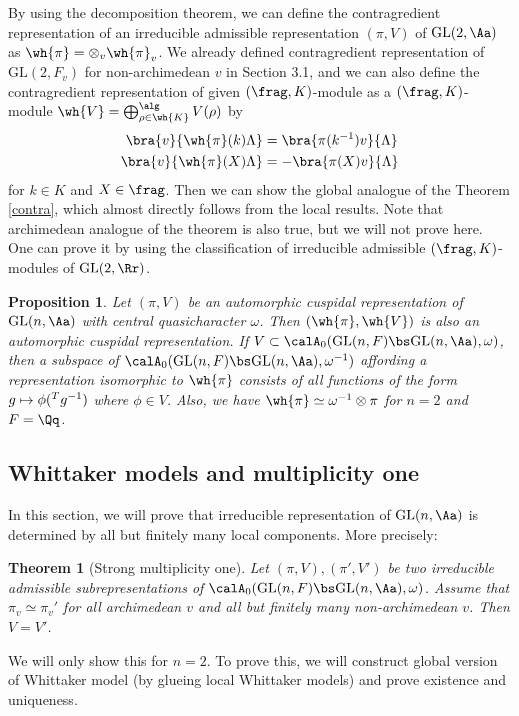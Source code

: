 \documentclass{article}
\newtheorem{theorem}{Theorem}[section]
\newcommand{\pre}[1]{\prescript{#1}{}}
\newcommand{\GL}{\mathrm{GL}}
\newtheorem{proposition}{Proposition}[section]
\begin{document}
By using the decomposition theorem, we can define the contragredient representation of an irreducible admissible representation $(\pi, V)$ of $\GL(2, \Aa)$ as $\wh{\pi} = \otimes_{v} \wh{\pi}_v$. 
We already defined contragredient representation of $\GL(2, F_{v})$ for non-archimedean $v$ in Section 3.1, and we can also define the contragredient representation of given $(\frag, K)$-module as a $(\frag, K)$-module $\wh{V} = \bigoplus_{\rho\in \wh{K}}^{\alg}V(\rho)$ by 
\begin{align*}
\bra{v}{\wh{\pi}(k)\Lambda} &= \bra{\pi(k^{-1})v}{\Lambda} \\
\bra{v}{\wh{\pi}(X)\Lambda} &= -\bra{\pi(X)v}{\Lambda} 
\end{align*}
for $k\in K$ and $X\in \frag$. 
Then we can show the global analogue of the Theorem \ref{contra}, which almost directly follows from the local results. 
Note that archimedean analogue of the theorem is also true, but we will not prove here. One can prove it by using the classification of irreducible admissible $(\frag, K)$-modules of $\GL(2, \Rr)$. 
\begin{proposition}
Let $(\pi, V)$ be an automorphic cuspidal representation of $\GL(n, \Aa)$ with central quasicharacter $\omega$. 
Then $(\wh{\pi}, \wh{V})$ is also an automorphic cuspidal representation. 
If $V\subset \calA_{0}(\GL(n, F)\bs\GL(n, \Aa), \omega)$, then a subspace of $\calA_{0}(\GL(n, F)\bs\GL(n, \Aa), \omega^{-1})$ affording a representation isomorphic to $\wh{\pi}$ consists of all functions of the form $g\mapsto \phi(\pre{T}{g}^{-1})$ where $\phi\in V$. 
Also, we have $\wh{\pi} \simeq \omega^{-1}\otimes \pi$ for $n = 2$ and $F = \Qq$. 
\end{proposition}





\subsection{Whittaker models and multiplicity one} 

In this section, we will prove that irreducible representation of $\GL(n, \Aa)$ is determined by all but finitely many local components. More precisely:
\begin{theorem}[Strong multiplicity one]
\label{multone}
Let $(\pi, V), (\pi', V')$ be two irreducible admissible subrepresentations of $\calA_{0}(\GL(n, F)\bs \GL(n, \Aa), \omega)$. 
Assume that $\pi_{v} \simeq \pi_{v}'$ for all archimedean $v$ and all but finitely many non-archimedean $v$. 
Then $V = V'$. 
\end{theorem}
We will only show this for $n = 2$. 
To prove this, we will construct global version of Whittaker model (by glueing local Whittaker models) and prove existence and uniqueness. 
\end{document}
